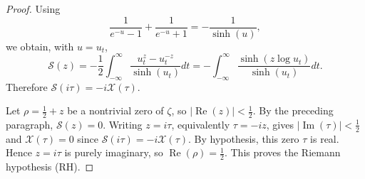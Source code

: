\documentclass[10pt,a4paper]{amsart}
\begin{document}
\begin{proof}
Using
$$
\frac{1}{e^{-u}-1}+\frac{1}{e^{-u}+1}
=
-\frac{1}{\sinh(u)},
$$
we obtain, with $u=u_t$,
$$
\mathcal{S}(z)
=
-\frac{1}{2}
\int_{-\infty}^{\infty}
\frac{u_t^z-u_t^{-z}}{\sinh(u_t)}dt
=
-\int_{-\infty}^{\infty}
\frac{\sinh(z\log u_t)}{\sinh(u_t)}dt.
$$
Therefore $\mathcal{S}(i\tau)=-i\mathcal{X}(\tau)$.

Let $\rho=\tfrac{1}{2}+z$ be a nontrivial zero of $\zeta$, so
$|\operatorname{Re}(z)|<\tfrac{1}{2}$. By the preceding paragraph,
$\mathcal{S}(z)=0$. Writing $z=i\tau$, equivalently $\tau=-iz$, gives
$|\operatorname{Im}(\tau)|<\tfrac{1}{2}$ and
$\mathcal{X}(\tau)=0$ since $\mathcal{S}(i\tau)=-i\mathcal{X}(\tau)$. By hypothesis, this zero
$\tau$ is real. Hence $z=i\tau$ is purely imaginary, so
$\operatorname{Re}(\rho)=\tfrac{1}{2}$. This proves the Riemann hypothesis (RH).
\end{proof}
\end{document}
